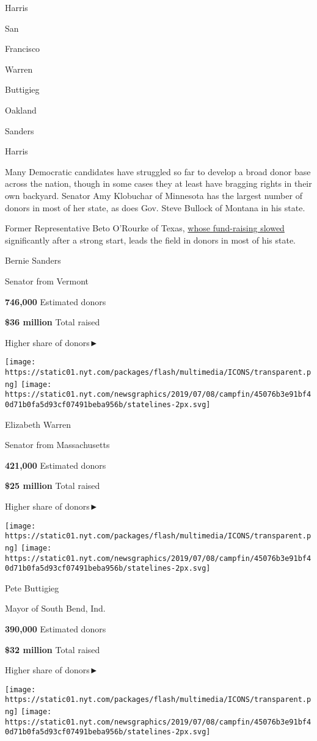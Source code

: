 Harris

San

Francisco

Warren

Buttigieg

Oakland

Sanders

Harris

Many Democratic candidates have struggled so far to develop a broad
donor base across the nation, though in some cases they at least have
bragging rights in their own backyard. Senator Amy Klobuchar of
Minnesota has the largest number of donors in most of her state, as does
Gov. Steve Bullock of Montana in his state.

Former Representative Beto O'Rourke of Texas,
\href{https://www.nytimes.com/2019/07/15/us/politics/beto-orourke-fundraising-2020.html}{whose
fund-raising slowed} significantly after a strong start, leads the field
in donors in most of his state.

Bernie Sanders

Senator from Vermont

\textbf{746,000} Estimated donors

\textbf{\$36 million} Total raised

Higher share of donors►

\texttt{[image: https://static01.nyt.com/packages/flash/multimedia/ICONS/transparent.png]}
\texttt{[image: https://static01.nyt.com/newsgraphics/2019/07/08/campfin/45076b3e91bf40d71b0fa5d93cf07491beba956b/statelines-2px.svg]}

Elizabeth Warren

Senator from Massachusetts

\textbf{421,000} Estimated donors

\textbf{\$25 million} Total raised

Higher share of donors►

\texttt{[image: https://static01.nyt.com/packages/flash/multimedia/ICONS/transparent.png]}
\texttt{[image: https://static01.nyt.com/newsgraphics/2019/07/08/campfin/45076b3e91bf40d71b0fa5d93cf07491beba956b/statelines-2px.svg]}

Pete Buttigieg

Mayor of South Bend, Ind.

\textbf{390,000} Estimated donors

\textbf{\$32 million} Total raised

Higher share of donors►

\texttt{[image: https://static01.nyt.com/packages/flash/multimedia/ICONS/transparent.png]}
\texttt{[image: https://static01.nyt.com/newsgraphics/2019/07/08/campfin/45076b3e91bf40d71b0fa5d93cf07491beba956b/statelines-2px.svg]}

